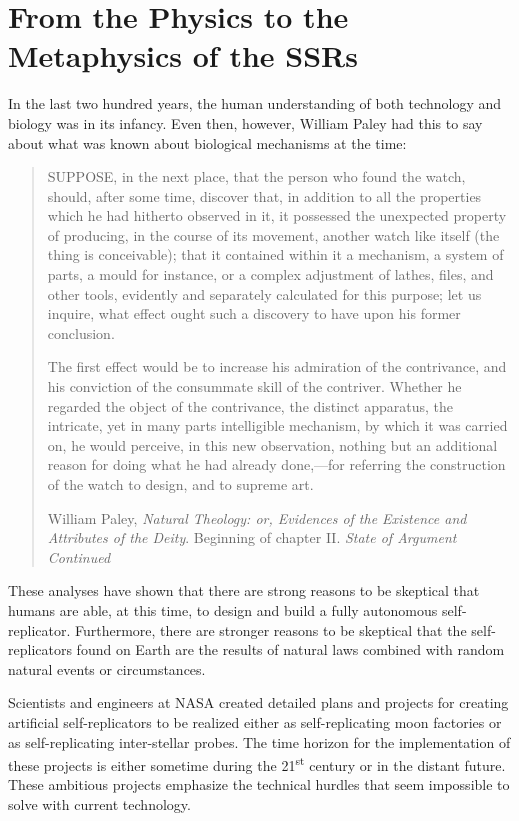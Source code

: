 \section[From the Physics to the Metaphysics]{From the Physics to the Metaphysics of the SSRs}

In the last two hundred years, the human understanding of both technology and
biology was in its infancy.  Even then, however, William Paley had this
to say about what was known about biological mechanisms at the time:

\begin{quote}
SUPPOSE, in the next place, that the person who found the
watch, should, after some time, discover that, in addition to all the
properties which he had hitherto observed in it, it possessed the
unexpected property of producing, in the course of its movement,
another watch like itself (the thing is conceivable); that it contained
within it a mechanism, a system of parts, a mould for instance, or a
complex adjustment of lathes, files, and other tools, evidently and
separately calculated for this purpose; let us inquire, what effect
ought such a discovery to have upon his former conclusion.

The first effect would be to increase his admiration of the
contrivance, and his conviction of the consummate skill of the
contriver. Whether he regarded the object of the contrivance, the
distinct apparatus, the intricate, yet in many parts intelligible
mechanism, by which it was carried on, he would perceive, in this new
observation, nothing but an additional reason for doing what he had
already done,---for referring the construction of the watch to design,
and to supreme art.

William Paley, \textit{Natural Theology: or, Evidences of the Existence
and Attributes of the Deity}. Beginning of chapter II. \textit{State of
Argument Continued}%
\end{quote}

These analyses have shown that there are strong reasons to be skeptical that
humans are able, at this time, to design and build a fully autonomous
self-replicator. Furthermore, there are stronger reasons to be skeptical that
the self-replicators found on Earth are the results of
natural laws combined with random natural events or circumstances.

Scientists and engineers at NASA created
detailed plans and projects for creating artificial self-replicators to
be realized either as self-replicating moon factories or as
self-replicating inter-stellar probes.  The time horizon for the
implementation of these projects is either sometime during the
21\textsuperscript{st} century or in the distant future. 
These ambitious projects emphasize the technical hurdles that seem impossible to solve with current technology.

